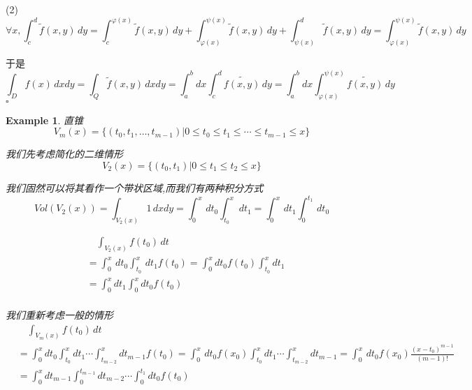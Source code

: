 \documentclass[11pt,hyperref,a4paper,UTF8]{ctexart}
\newtheorem{example}{Example}[subsection]
\newenvironment{cproof}{%
\heiti{证明}\kaishu
}{%
  \hfill $\square$
  \par\bigskip
}
\begin{document}
\begin{CJK}{UTF8}{gkai}
\begin{cproof}
  (2)
  \[\forall x, \int_{c}^{d}\tilde{f}(x,y)\,dy = \int_{c}^{\varphi(x)}\tilde{f}(x,y)\,dy + \int_{\varphi(x)}^{\psi(x)}\tilde{f}(x,y)\,dy + \int_{\psi(x)}^{d}\tilde{f}(x,y)\,dy = \int_{\varphi(x)}^{\psi(x)}\tilde{f}(x,y)\,dy\]

  于是
  \[\int_{D} f(x)\, dx dy = \int_{Q} \tilde{f}(x,y)\, dx dy = \int_{a}^{b}dx \int_{c}^{d}\tilde{f(x,y)}\, dy = \int_{a}^{b}dx \int_{\varphi(x)}^{\psi(x)}\tilde{f(x,y)}\, dy \]
\end{cproof}

\begin{example}
  直锥
  \[V_m(x) = \{(t_0,t_1,\ldots,t_{m - 1})| 0 \leq t_0 \leq t_1 \leq \cdots \leq t_{m - 1} \leq x\}\]

  我们先考虑简化的二维情形
  \[V_2(x) = \{(t_0,t_1)| 0 \leq t_1 \leq t_2 \leq x\}\]

  \begin{center}
\end{center}


  我们固然可以将其看作一个带状区域,而我们有两种积分方式
  \[Vol(V_2(x)) = \int_{V_2(x)} 1 \, dx dy = \int_{0}^{x}\, dt_0 \int_{t_0}^{x}\, dt_1 = \int_{0}^{x} \, dt_1 \int_{0}^{t_1}\, dt_0\]

  \[
    \begin{aligned}
      &\quad\int_{V_2(x)} f(t_0)\, dt \\
      &= \int_{0}^{x}\, dt_0 \int_{t_0}^{x}\, dt_1 f(t_0) = \int_{0}^{x} dt_0 f(t_0) \int_{t_0}^x dt_1\\
      &= \int_{0}^{x}dt_1 \int_{0}^{x}dt_0 f(t_0)\\
    \end{aligned}  
    \]
    
  我们重新考虑一般的情形
  \[\begin{aligned}
    &\quad\int_{V_m(x)} f(t_0)\, dt\\
    &= \int_{0}^{x}dt_0 \int_{t_0}^{x}dt_1\cdots \int_{t_{m - 2}}^{x} dt_{m - 1}f(t_0) = \int_{0}^{x}\, dt_0 f(x_0) \int_{t_0}^{x}dt_1\cdots \int_{t_{m - 2}}^{x} dt_{m - 1} = \int_{0}^{x}\, dt_0 f(x_0) \frac{(x - t_0)^{m - 1}}{(m - 1)!}\\
    &= \int_{0}^{x}dt_{m - 1}\int_{0}^{t_{m - 1}}dt_{m - 2}\cdots \int_{0}^{t_1}dt_0 f(t_0)\\
  \end{aligned}\]


\end{example}
\end{CJK}
\end{document}
